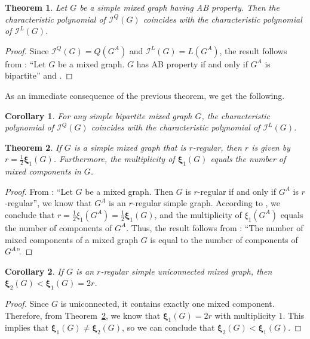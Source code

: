 \documentclass[12pt]{article}
\numberwithin{equation}{section}
\newtheorem{thm}{Theorem}[section]
\newtheorem{cor}{Corollary}[section]
\begin{document}
	\begin{thm}\label{Th3.2}
		Let $G$ be a simple mixed graph having AB property. Then the characteristic polynomial of $\mathcal{I}^Q(G)$ coincides with the characteristic polynomial of $\mathcal{I}^L(G)$.
	\end{thm}
	\begin{proof}
		 Since $\mathcal{I}^Q(G)=Q(G^A)$ and $\mathcal{I}^L(G)=L(G^A)$, the result follows from   \cite[Lemma~4.1]{Kalaimatrices1}: ``Let $G$ be a mixed graph. $G$ has AB property if and only if $G^A$ is bipartite'' and \cite[Proposition~7.8.4]{cvetkovic}.
	\end{proof}
	As an immediate consequence of the previous theorem, we get the following.
	\begin{cor}
		For any simple bipartite mixed graph $G$, the characteristic polynomial of $\mathcal{I}^Q(G)$ coincides with the characteristic polynomial of $\mathcal{I}^L(G)$.
	\end{cor}
	
	\begin{thm}\label{Th3.4}
	If $ G $ is a simple mixed graph that is $ r $-regular, then $ r $ is given by $ r = \frac{1}{2} \bm{\xi}_1(G) $. Furthermore, the multiplicity of $\bm{\xi}_1(G) $ equals the number of mixed components in $ G $.
	\end{thm}
	\begin{proof}
		From \cite[Lemma~6.1]{Kalaimatrices1}: ``Let $G$ be a mixed graph. Then $G$ is $r$-regular if and only if $G^A$ is $r$-regular'', we know that $G^A$ is an $r$-regular simple graph. According to  \cite[Theorem~7.8.6]{cvetkovic}, 
		 we conclude that $r=\frac{1}{2}\xi_1(G^A)=\frac{1}{2}\bm{\xi}_1(G)$, and  the multiplicity of $\xi_1(G^A)$ equals the number of components of $G^A$. Thus,  the result follows from \cite[Corollary~6.1]{Kalaimatrices1}: ``The number of mixed components of a mixed graph $G$ is equal to the number of components of $G^A$''.
	\end{proof}
	\begin{cor}
		If $G$ is an $r$-regular simple uniconnected mixed graph, then $\bm{\xi}_2(G)<\bm{\xi}_1(G)=2r$.
	\end{cor}
	\begin{proof}
		Since $G$ is uniconnected, it contains exactly one mixed component.
		Therefore,  from Theorem~\ref{Th3.4}, we know that $\bm{\xi}_1(G)=2r$ with multiplicity  $1$. This implies that $\bm{\xi}_1(G)\neq\bm{\xi}_2(G)$, so we can conclude that $\bm{\xi}_2(G)<\bm{\xi}_1(G)$.
	\end{proof}
	
\end{document}
